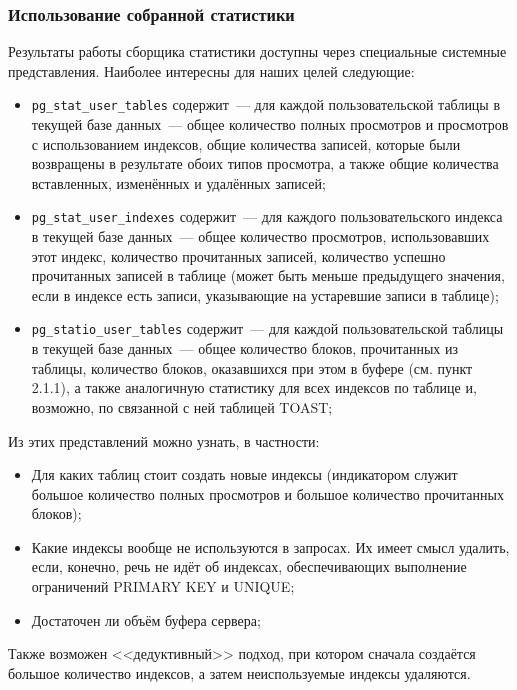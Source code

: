 \subsubsection{Использование собранной статистики}

Результаты работы сборщика статистики доступны через специальные системные представления. Наиболее интересны для наших целей следующие:

\begin{itemize}
  \item \lstinline!pg_stat_user_tables! содержит~--- для каждой пользовательской таблицы в текущей базе данных~--- общее количество полных просмотров и просмотров с использованием индексов, общие количества записей, которые были возвращены в результате обоих типов просмотра, а также общие количества вставленных, изменённых и удалённых записей;
  \item \lstinline!pg_stat_user_indexes! содержит~--- для каждого пользовательского индекса в текущей базе данных~--- общее количество просмотров, использовавших этот индекс, количество прочитанных записей, количество успешно прочитанных записей в таблице (может быть меньше предыдущего значения, если в индексе есть записи, указывающие на устаревшие записи в таблице);
  \item \lstinline!pg_statio_user_tables! содержит~--- для каждой пользовательской таблицы в текущей базе данных~--- общее количество блоков, прочитанных из таблицы, количество блоков, оказавшихся при этом в буфере (см. пункт 2.1.1), а также аналогичную статистику для всех индексов по таблице и, возможно, по связанной с ней таблицей TOAST;
\end{itemize}

Из этих представлений можно узнать, в частности:

\begin{itemize}
 \item Для каких таблиц стоит создать новые индексы (индикатором служит большое количество полных просмотров и большое количество прочитанных блоков);
 \item Какие индексы вообще не используются в запросах. Их имеет смысл удалить, если, конечно, речь не идёт об индексах, обеспечивающих выполнение ограничений PRIMARY KEY и UNIQUE;
 \item Достаточен ли объём буфера сервера;
\end{itemize}

Также возможен <<дедуктивный>> подход, при котором сначала создаётся большое количество индексов, а затем неиспользуемые индексы удаляются.


